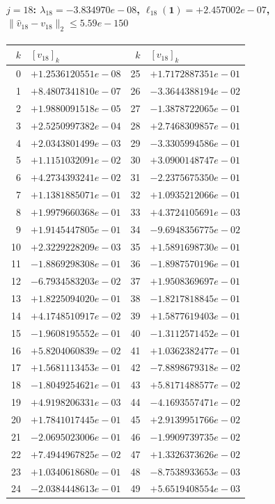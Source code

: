 \documentclass[11pt]{article}
\begin{document}
\paragraph{$j = 18$: $\lambda_{18} = -3.834970e-08$, \quad $\ell_{18}(\mathbf{1}) = +2.457002e-07$, \quad $\|\hat{v}_{18} - v_{18}\|_2 \leq 5.59e-150$}
\begin{center}
{\footnotesize
\begin{tabular}{r@{\;\;}l@{\quad}r@{\;\;}l}
\toprule
$k$ & $[v_{18}]_k$ & $k$ & $[v_{18}]_k$ \\
\midrule
0 & $+1.2536120551e-08$ & 25 & $+1.7172887351e-01$ \\
1 & $+8.4807341810e-07$ & 26 & $-3.3644388194e-02$ \\
2 & $+1.9880091518e-05$ & 27 & $-1.3878722065e-01$ \\
3 & $+2.5250997382e-04$ & 28 & $+2.7468309857e-01$ \\
4 & $+2.0343801499e-03$ & 29 & $-3.3305994586e-01$ \\
5 & $+1.1151032091e-02$ & 30 & $+3.0900148747e-01$ \\
6 & $+4.2734393241e-02$ & 31 & $-2.2375675350e-01$ \\
7 & $+1.1381885071e-01$ & 32 & $+1.0935212066e-01$ \\
8 & $+1.9979660368e-01$ & 33 & $+4.3724105691e-03$ \\
9 & $+1.9145447805e-01$ & 34 & $-9.6948356775e-02$ \\
10 & $+2.3229228209e-03$ & 35 & $+1.5891698730e-01$ \\
11 & $-1.8869298308e-01$ & 36 & $-1.8987570196e-01$ \\
12 & $-6.7934583203e-02$ & 37 & $+1.9508369697e-01$ \\
13 & $+1.8225094020e-01$ & 38 & $-1.8217818845e-01$ \\
14 & $+4.1748510917e-02$ & 39 & $+1.5877619403e-01$ \\
15 & $-1.9608195552e-01$ & 40 & $-1.3112571452e-01$ \\
16 & $+5.8204060839e-02$ & 41 & $+1.0362382477e-01$ \\
17 & $+1.5681113453e-01$ & 42 & $-7.8898679318e-02$ \\
18 & $-1.8049254621e-01$ & 43 & $+5.8171488577e-02$ \\
19 & $+4.9198206331e-03$ & 44 & $-4.1693557471e-02$ \\
20 & $+1.7841017445e-01$ & 45 & $+2.9139951766e-02$ \\
21 & $-2.0695023006e-01$ & 46 & $-1.9909739735e-02$ \\
22 & $+7.4944967825e-02$ & 47 & $+1.3326373626e-02$ \\
23 & $+1.0340618680e-01$ & 48 & $-8.7538933653e-03$ \\
24 & $-2.0384448613e-01$ & 49 & $+5.6519408554e-03$ \\
\bottomrule
\end{tabular}
}
\end{center}
\end{document}
